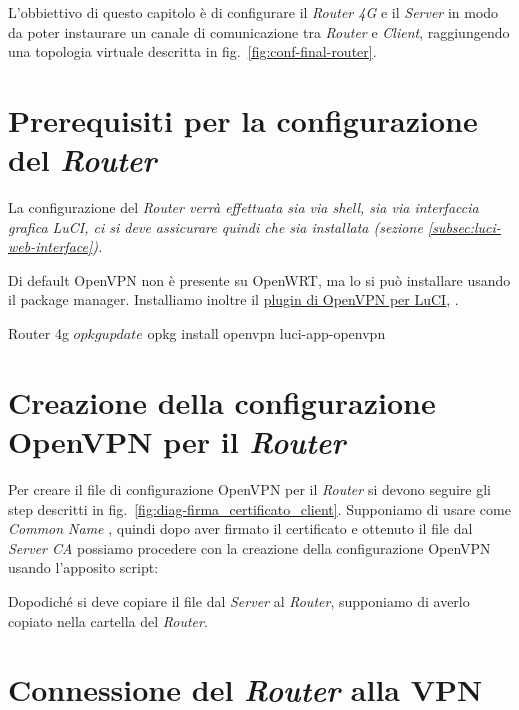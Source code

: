 L'obbiettivo di questo capitolo è di configurare il \textit{Router 4G} e il \textit{Server} in modo da poter instaurare un canale di comunicazione tra \textit{Router} e \textit{Client}, raggiungendo una topologia virtuale descritta in fig.~\ref{fig:conf-final-router}.

\section{Prerequisiti per la configurazione del \textit{Router} \ok}

La configurazione del \it{Router} verrà effettuata sia via shell, sia via interfaccia grafica LuCI, ci si deve assicurare quindi che sia installata (sezione \ref{subsec:luci-web-interface}).

Di default OpenVPN non è presente su OpenWRT, ma lo si può installare usando il package manager. Installiamo inoltre il \href{https://openwrt.org/docs/guide-user/services/vpn/openvpn/client-luci}{plugin di OpenVPN per LuCI}, .

\begin{bashcode}{Router 4g}{}
$ opkg update
$ opkg install openvpn luci-app-openvpn
\end{bashcode}

\section{Creazione della configurazione OpenVPN per il \textit{Router} \ok}

Per creare il file di configurazione OpenVPN per il \textit{Router} si devono seguire gli step descritti in fig.~\ref{fig:diag-firma_certificato_client}. Supponiamo di usare come \textit{Common Name} , quindi dopo aver firmato il certificato e ottenuto il file  dal \textit{Server CA} possiamo procedere con la creazione della configurazione OpenVPN usando l'apposito script:


Dopodiché si deve copiare il file  dal \textit{Server} al \textit{Router}, supponiamo di averlo copiato nella cartella  del \textit{Router}. 


\section{Connessione del \textit{Router} alla VPN \ok}

